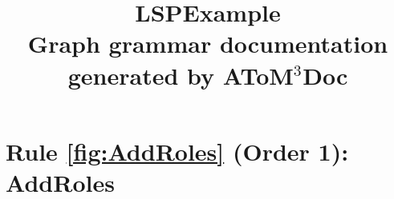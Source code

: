 \documentclass{article}
\title{ \huge{LSPExample} \\[4mm]
\small{ Graph grammar documentation generated by \textbf{AToM$^{3}$Doc} } }
\begin{document}
   
\maketitle         
\section*{  Rule \ref{fig:AddRoles} (Order 1): AddRoles}
\end{document}
